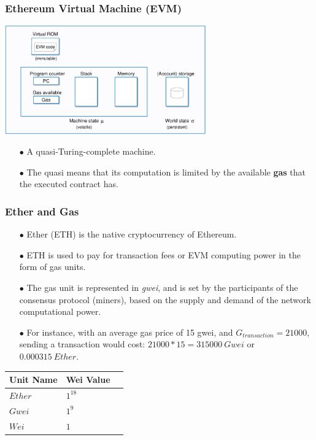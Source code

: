 \documentclass{beamer}
\begin{document}
\begin{frame}
	\frametitle{Ethereum Virtual Machine (EVM)}
	\includegraphics[width=0.65\textwidth, center]{../images/evm}
	\begin{itemize}
		\item[$\bullet$] A quasi-Turing-complete machine.
		\item[$\bullet$] The quasi means that its computation is limited by the available \textbf{gas} that the executed contract has.
	\end{itemize}
\end{frame}

\begin{frame}
	\frametitle{Ether and Gas}
	\begin{itemize}
		\item[$\bullet$] Ether (ETH) is the native cryptocurrency of Ethereum.
		\item[$\bullet$] ETH is used to pay for transaction fees or EVM computing power in the form of gas units.
		\item[$\bullet$] The gas unit is represented in \textit{gwei}, and is set by the participants of the consensus protocol (miners), based on the supply and demand of the network computational power.
		\item[$\bullet$] For instance, with an average gas price of 15 gwei, and $G_{transaction} = 21000$, sending a transaction would cost: $21000*15 = 315000~Gwei$ or $0.000315~Ether.$
	\end{itemize}

\begin{table}[htp]
	\centering
	\begin{tabular}{|l|l|l|}
		\hline
		\multicolumn{1}{|c|}{\textbf{Unit Name}} & 
		\multicolumn{1}{|c|}{\textbf{Wei Value}} \\\hline
		$Ether$ & $1^{18}$  \\\hline
		$Gwei$  & $1^{9}$  \\\hline
		$Wei$   & $1$     \\\hline   
	\end{tabular}
\end{table}

\end{frame}
\end{document}
